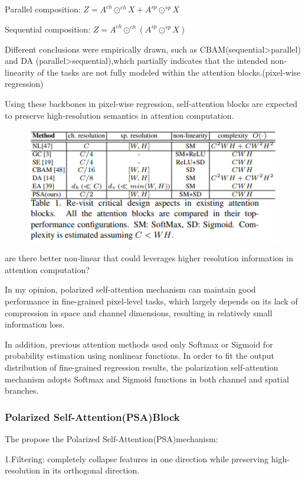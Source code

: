\documentclass[11pt]{article}
\begin{document}
\noindent Parallel composition: $Z = A^{ch} \odot^{ch} X + A^{sp} \odot^{sp}X$

\noindent Sequential composition: $Z = A^{ch} \odot^{ch}(A^{sp} \odot^{sp} X)$

Different conclusions were empirically drawn, such as CBAM(sequential>parallel) and DA (parallel>sequential),which partially indicates that the intended non-linearity of the tasks are not fully modeled within the attention blocks.(pixel-wise regression)

Using these backbones in pixel-wise regression, self-attention blocks are expected to preserve high-resolution semantics in attention computation.

\begin{figure}[h]
	\centering
	\includegraphics[scale = 0.5]{18}
\end{figure}

are there better non-linear that could leverages higher resolution information in attention computation?

In my opinion, polarized self-attention mechanism can maintain good performance in fine-grained pixel-level tasks, which largely depends on its lack of compression in space and channel dimensions, resulting in relatively small information loss.

In addition, previous attention methods used only Softmax or Sigmoid for probability estimation using nonlinear functions. In order to fit the output distribution of fine-grained regression results, the polarization self-attention mechanism adopts Softmax and Sigmoid functions in both channel and spatial branches.

\subsubsection{Polarized Self-Attention(PSA)Block}
The propose the Polarized Self-Attention(PSA)mechanism:

\noindent 1.Filtering: completely collapse features in one direction while preserving high-resolution in its orthogonal direction.
\end{document}
